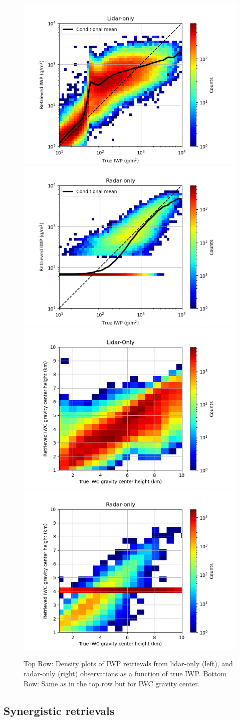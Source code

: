\documentclass{ametsocV6.1}
\begin{document}
\begin{figure}
    \centering
    \includegraphics[width=.481\linewidth]{Figs/fig07a.rev.png}
    \includegraphics[width=.481\linewidth]{Figs/fig07b.rev.png}
    \includegraphics[width=.481\linewidth]{Figs/fig07c.rev.png}
    \includegraphics[width=.481\linewidth]{Figs/fig07d.rev.png}
    \caption{Top Row: Density plots of IWP retrievals from lidar-only (left), and radar-only (right) observations as a function
    of true IWP. Bottom Row: Same as in the top row but for IWC gravity center.}\label{f7}
\end{figure}

\subsection{Synergistic retrievals}
\end{document}
